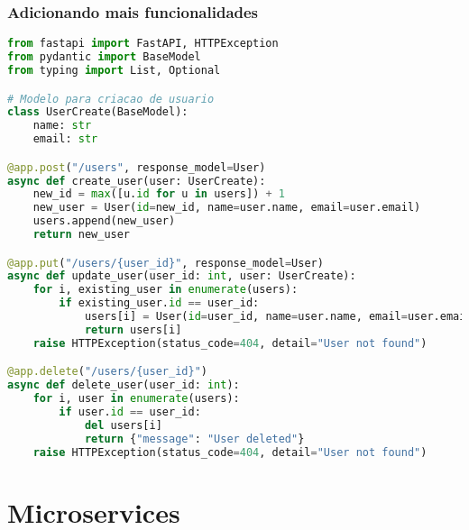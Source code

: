 \documentclass[aspectratio=169]{beamer}
\begin{document}
\begin{frame}[fragile]
    \frametitle{Adicionando mais funcionalidades}
    \begin{lstlisting}[language=Python]
from fastapi import FastAPI, HTTPException
from pydantic import BaseModel
from typing import List, Optional

# Modelo para criacao de usuario
class UserCreate(BaseModel):
    name: str
    email: str

@app.post("/users", response_model=User)
async def create_user(user: UserCreate):
    new_id = max([u.id for u in users]) + 1
    new_user = User(id=new_id, name=user.name, email=user.email)
    users.append(new_user)
    return new_user

@app.put("/users/{user_id}", response_model=User)
async def update_user(user_id: int, user: UserCreate):
    for i, existing_user in enumerate(users):
        if existing_user.id == user_id:
            users[i] = User(id=user_id, name=user.name, email=user.email)
            return users[i]
    raise HTTPException(status_code=404, detail="User not found")

@app.delete("/users/{user_id}")
async def delete_user(user_id: int):
    for i, user in enumerate(users):
        if user.id == user_id:
            del users[i]
            return {"message": "User deleted"}
    raise HTTPException(status_code=404, detail="User not found")
    \end{lstlisting}
\end{frame}

\section{Microservices}
\end{document}
